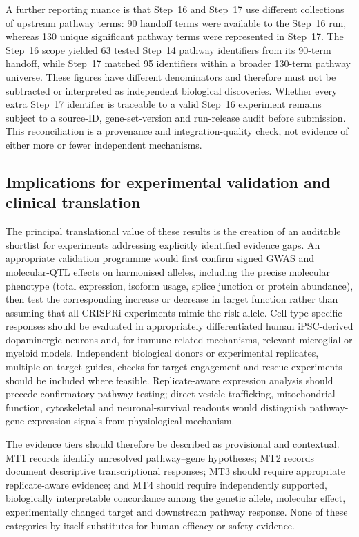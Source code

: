 \documentclass[11pt,a4paper]{article}
\begin{document}
A further reporting nuance is that Step~16 and Step~17 use different collections of upstream pathway terms: 90 handoff terms were available to the Step~16 run, whereas 130 unique significant pathway terms were represented in Step~17. The Step~16 scope yielded 63 tested Step~14 pathway identifiers from its 90-term handoff, while Step~17 matched 95 identifiers within a broader 130-term pathway universe. These figures have different denominators and therefore must not be subtracted or interpreted as independent biological discoveries. Whether every extra Step~17 identifier is traceable to a valid Step~16 experiment remains subject to a source-ID, gene-set-version and run-release audit before submission. This reconciliation is a provenance and integration-quality check, not evidence of either more or fewer independent mechanisms.

\subsection{Implications for experimental validation and clinical translation}
\label{subsec:discussion_next}
The principal translational value of these results is the creation of an auditable shortlist for experiments addressing explicitly identified evidence gaps. An appropriate validation programme would first confirm signed GWAS and molecular-QTL effects on harmonised alleles, including the precise molecular phenotype (total expression, isoform usage, splice junction or protein abundance), then test the corresponding increase or decrease in target function rather than assuming that all CRISPRi experiments mimic the risk allele. Cell-type-specific responses should be evaluated in appropriately differentiated human iPSC-derived dopaminergic neurons and, for immune-related mechanisms, relevant microglial or myeloid models. Independent biological donors or experimental replicates, multiple on-target guides, checks for target engagement and rescue experiments should be included where feasible. Replicate-aware expression analysis should precede confirmatory pathway testing; direct vesicle-trafficking, mitochondrial-function, cytoskeletal and neuronal-survival readouts would distinguish pathway-gene-expression signals from physiological mechanism.

The evidence tiers should therefore be described as provisional and contextual. MT1 records identify unresolved pathway--gene hypotheses; MT2 records document descriptive transcriptional responses; MT3 should require appropriate replicate-aware evidence; and MT4 should require independently supported, biologically interpretable concordance among the genetic allele, molecular effect, experimentally changed target and downstream pathway response. None of these categories by itself substitutes for human efficacy or safety evidence.
\end{document}
